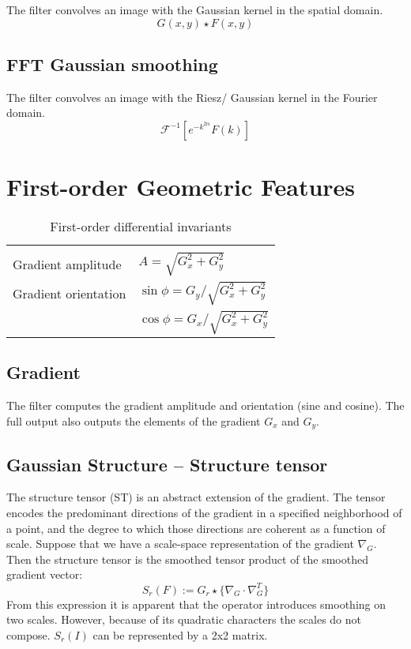\documentclass{amsart}
\begin{document}
The filter convolves an image with the Gaussian kernel in the spatial domain.
\[
G (x,y) \star F (x,y)
\]

\subsection{FFT Gaussian smoothing}\label{sec:fftgauss}

The filter convolves an image with the Riesz/ Gaussian kernel in the Fourier domain.
  \[
   \mathcal{F}^{-1}\left[  e^{-k^{2 \alpha}} F(k)\right] 
  \]
\section{First-order Geometric Features}\label{sec:1order}

\begin{table}[h!]
	\centering
	\begin{tabular}{ll}
		\hline
		\\
		Gradient amplitude & $ A= \sqrt{G_x^2+ G_y^2} $\\
		Gradient orientation & $ \sin{\phi}= G_y / \sqrt{G_x^2+ G_y^2} $\\
		& $ \cos{\phi}= G_x / \sqrt{G_x^2+ G_y^2} $\\
		\hline
	\end{tabular} 
	\caption{First-order differential invariants}\label{tab:grad} 
\end{table}
\subsection{Gradient }\label{sec:gradient}
The  filter computes the gradient  amplitude and orientation (sine and cosine).
The full output also outputs the elements of the gradient $G_x$ and $G_y$.


\subsection{Gaussian Structure -- Structure tensor}\label{sec:struct}

The structure tensor (ST) is an abstract extension of the gradient.  
The tensor encodes the predominant directions of the gradient in a specified neighborhood of a point, and the degree to which those directions 
are coherent as a function of scale.
Suppose that we have a scale-space representation of the gradient  $\nabla_G $.
Then the structure tensor is the smoothed tensor product of the smoothed gradient vector\cite{Brox2004}:
\[
S_r (F) := G_r \star \{ \nabla_G  \cdot \nabla_G ^T   \}
\]
From this expression it is apparent that the operator introduces smoothing on two scales.
However, because of its quadratic characters the scales do not compose.
$S_r (I)$ can be represented by a 2x2 matrix. %
\end{document}
